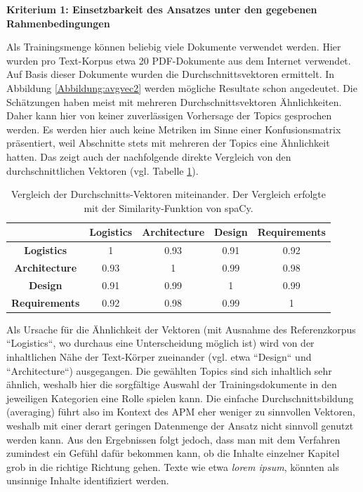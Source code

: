 {\bf Kriterium 1: Einsetzbarkeit des Ansatzes unter den gegebenen Rahmenbedingungen}

Als Trainingsmenge können beliebig viele Dokumente verwendet werden. Hier wurden pro Text-Korpus etwa 20 PDF-Dokumente aus dem Internet verwendet. Auf Basis dieser Dokumente wurden die Durchschnittsvektoren ermittelt. 
In Abbildung \ref{Abbildung:avgvec2} werden mögliche Resultate schon angedeutet. Die Schätzungen haben meist mit mehreren Durchschnittsvektoren Ähnlichkeiten. Daher kann hier von keiner zuverlässigen Vorhersage der Topics gesprochen werden. 
Es werden hier auch keine Metriken im Sinne einer Konfusionsmatrix präsentiert, weil Abschnitte stets mit mehreren der Topics eine Ähnlichkeit hatten. Das zeigt auch der nachfolgende direkte Vergleich von den durchschnittlichen Vektoren (vgl. Tabelle \ref{table:4}).

\begin{table}[h]
\centering
\begin{tabular}{|c|c|c|c|c|}
\hline
                      & \textbf{Logistics} & \textbf{Architecture} & \textbf{Design} & \textbf{Requirements} \\ \hline
\textbf{Logistics}    & 1                  & 0.93                  & 0.91            & 0.92                  \\ \hline
\textbf{Architecture} & 0.93               & 1                     & 0.99            & 0.98                  \\ \hline
\textbf{Design}       & 0.91               & 0.99                  & 1               & 0.99                  \\ \hline
\textbf{Requirements} & 0.92               & 0.98                  & 0.99            & 1                     \\ \hline
\end{tabular}
\caption{Vergleich der Durchschnitts-Vektoren miteinander. Der Vergleich erfolgte mit der Similarity-Funktion von spaCy.}
\label{table:4}
\end{table}

Als Ursache für die Ähnlichkeit der Vektoren (mit Ausnahme des Referenzkorpus ``Logistics``, wo durchaus eine Unterscheidung möglich ist) wird von der inhaltlichen Nähe der Text-Körper zueinander (vgl. etwa ``Design`` und ``Architecture``) ausgegangen. Die gewählten Topics sind sich inhaltlich sehr ähnlich, weshalb hier die sorgfältige Auswahl der Trainingsdokumente in den jeweiligen Kategorien eine Rolle spielen kann. Die einfache Durchschnittsbildung (averaging) führt also im Kontext des APM eher weniger zu sinnvollen Vektoren, weshalb mit einer derart geringen Datenmenge der Ansatz nicht sinnvoll genutzt werden kann.
Aus den Ergebnissen folgt jedoch, dass man mit dem Verfahren zumindest ein Gefühl dafür bekommen kann, ob die Inhalte einzelner Kapitel grob in die richtige Richtung gehen. Texte wie etwa {\textit{lorem ipsum}}, könnten als unsinnige Inhalte identifiziert werden.

